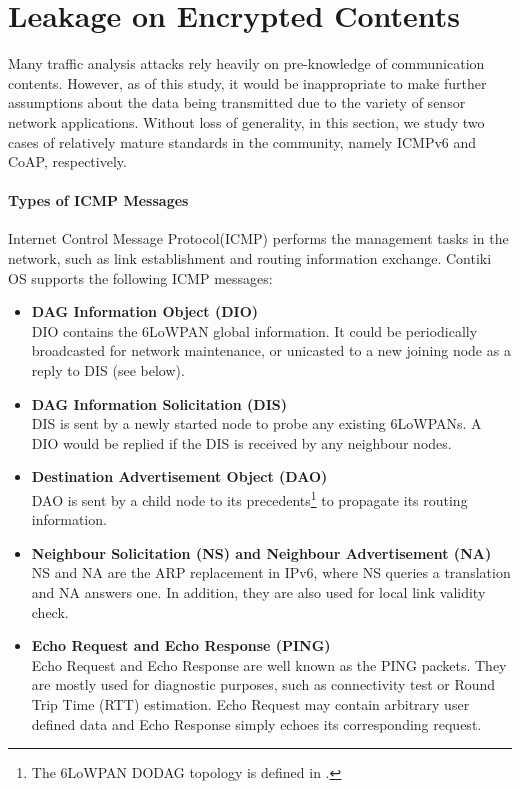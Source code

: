 \section{Leakage on Encrypted Contents}


Many traffic analysis attacks rely heavily on pre-knowledge of communication contents. However, as of this study, it would be inappropriate to make further assumptions about the data being transmitted due to the variety of sensor network applications. Without loss of generality, in this section, we study   two cases of relatively mature standards in the community, namely ICMPv6 and CoAP, respectively.

\paragraph{Types of ICMP Messages}

Internet Control Message Protocol(ICMP)\cite{rfc4443} performs the management tasks in the network, such as link establishment and routing information exchange. Contiki OS supports the following ICMP messages:

\begin{itemize}
	\item \textbf{DAG Information Object (DIO)} \\
	DIO contains the 6LoWPAN global information. It could be periodically broadcasted for network maintenance, or unicasted to a new joining node as a reply to DIS (see below).
	\item \textbf{DAG Information Solicitation (DIS)} \\
	DIS is sent by a newly started node to probe any existing 6LoWPANs. A DIO would be replied if the DIS is received by any neighbour nodes.
	\item \textbf{Destination Advertisement Object (DAO)} \\
	DAO is sent by a child node to its precedents\footnote{The 6LoWPAN DODAG topology is defined in \cite{rfc6550}.} to propagate its routing information.
	\item \textbf{Neighbour Solicitation (NS) and Neighbour Advertisement (NA)} \\
	NS and NA are the ARP replacement in IPv6, where NS queries a translation and NA answers one. In addition, they are also used for local link validity check.
	\item \textbf{Echo Request and Echo Response (PING)} \\
	Echo Request and Echo Response are well known as the PING packets. They are mostly used for diagnostic purposes, such as connectivity test or Round Trip Time (RTT) estimation. Echo Request may contain arbitrary user defined data and Echo Response simply echoes its corresponding request.
\end{itemize}

